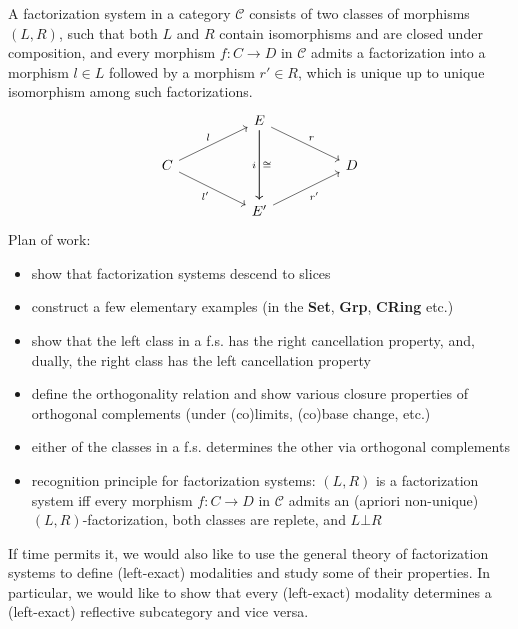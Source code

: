 %

A factorization system in a category $\mathcal{C}$ consists of two classes of morphisms $(L,R)$, such that both $L$ and $R$ contain isomorphisms and are closed under composition, and every morphism $f: C \to D$ in $\mathcal{C}$ admits a factorization into a morphism $l\in L$ followed by a morphism $r'\in R$, which is unique up to unique isomorphism among such factorizations.
\[\begin{tikzcd}
	&& E \\
	C &&&& D \\
	&& {E'}
	\arrow["r", from=1-3, to=2-5]
	\arrow["i"', from=1-3, to=3-3]
	\arrow["\cong", from=1-3, to=3-3]
	\arrow["l", from=2-1, to=1-3]
	\arrow["{l'}"', from=2-1, to=3-3]
	\arrow["{r'}"', from=3-3, to=2-5]
\end{tikzcd}\]
Plan of work:
\begin{itemize}
    \item show that factorization systems descend to slices
    \item construct a few elementary examples (in the \textbf{Set}, \textbf{Grp}, \textbf{CRing} etc.)
    \item show that the left class in a f.s. has the right cancellation property, and, dually, the right class has the left cancellation property
    \item define the orthogonality relation and show various closure properties of orthogonal complements (under (co)limits, (co)base change, etc.) 
    \item either of the classes in a f.s. determines the other via orthogonal complements
    \item recognition principle for factorization systems: $(L,R)$ is a factorization system iff every morphism $f: C \to D$ in $\mathcal{C}$ admits an (apriori non-unique) $(L,R)$-factorization, both classes are replete, and $L\bot R$
\end{itemize}
If time permits it, we would also like to use the general theory of factorization systems to define (left-exact) modalities and study some of their properties. In particular, we would like to show that every (left-exact) modality determines a (left-exact) reflective subcategory and vice versa.